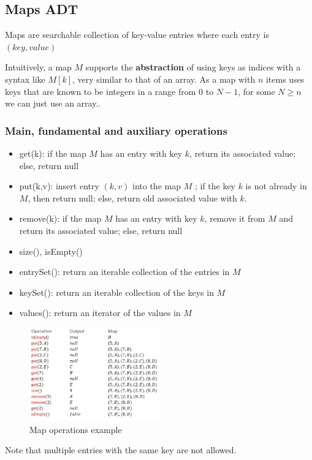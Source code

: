 \documentclass[a4paper]{article}
\theoremstyle{plain}
\theoremstyle{definition}
\newtheorem{defn}{Definition}[section]
\newtheorem{exmp}{Example}[section]
\theoremstyle{remark}
\begin{document}
\subsection{Maps ADT}
\begin{tcolorbox}[colback=black!3!white,colframe=black!60!white,title=\begin{defn}Maps \label{Maps}\end{defn}]
Maps are searchable collection of key-value entries where each entry is $(key,value)$
\end{tcolorbox}
Intuitively, a map $M$ supports the \textbf{abstraction} of using keys as indices with a syntax like $M[k]$, very similar to that of an array. As a map with $n$ items uses keys that are known to be integers in a range from $0$ to $N-1$, for some $N \ge n$ we can just use an array..
\subsubsection{Main, fundamental and auxiliary operations}
\begin{itemize}
	\item get(k): if the map $M$ has an entry with key $k$, return its associated value; else, return null
	\item put(k,v): insert entry $(k,v)$ into the map $M$ ; if the key $k$ is not already in $M$, then return null; else, return old associated value with $k$.
	\item remove(k): if the map $M$ has an entry with key $k$, remove it from $M$ and return its associated value; else, return null
	\item size(), isEmpty()
	\item entrySet(): return an iterable collection of the entries in $M$ 
	\item keySet(): return an iterable collection of the keys in $M$
	\item values(): return an iterator of the values in $M$
\end{itemize}
\begin{tcolorbox}[colback=black!3!white,colframe=black!60!white,title=\begin{exmp}Operations example \label{Operations example}\end{exmp}]
\begin{figure}[H]
	\centering
	\includegraphics[width=0.5\textwidth]{figures/map.png}
	\caption{Map operations example}
	\label{fig:figures-map-png}
\end{figure}
\end{tcolorbox}
Note that multiple entries with the same key are not allowed.
\end{document}
